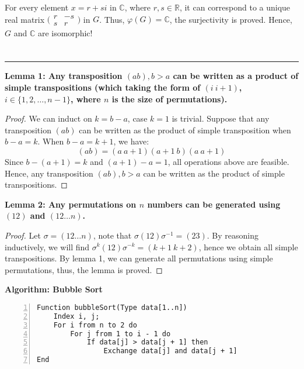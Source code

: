 \documentclass[12pt]{article}
\begin{document}
For every element $x=r+si$ in $\mathbb{C}$, where $r,s\in\mathbb{R}$, it can correspond to a unique real matrix $\big(\begin{smallmatrix} r& -s\\s & r\end{smallmatrix}\big)$ in $G$. Thus, $\varphi(G)=\mathbb{C}$, the surjectivity is proved. Hence, $G$ and $\mathbb{C}$ are isomorphic!

\newpage
\section{} %
\subsection{}
\noindent\rule{\textwidth}{1pt}
\textbf{Lemma 1: Any transposition $(ab),b>a$ can be written as a product of simple transpositions (which taking the form of $(i\ i+1)$, $i\in \{1,2,\dots,n-1\}$, where $n$ is the size of permutations).}

\begin{proof}
We can induct on $k=b-a$, case $k=1$ is trivial. Suppose that any transposition $(ab)$ can be written as the product of simple transposition when $b-a=k$. When $b-a=k+1$, we have:
$$(ab)=(a\ a+1)(a+1\ b)(a\ a+1)$$
Since $b-(a+1)=k$ and $(a+1)-a=1$, all operations above are feasible. Hence, any transposition $(ab),b>a$ can be written as the product of simple transpositions.
\end{proof}

\noindent\textbf{Lemma 2: Any permutations on $n$ numbers can be generated using $(12)$ and $(12\dots n)$.}

\begin{proof}
Let $\sigma=(12\dots n)$, note that $\sigma(12)\sigma^{-1}=(23)$. By reasoning inductively, we will find $\sigma^k (12)\sigma^{-k}=(k+1\ k+2)$, hence we obtain all simple transpositions. By lemma 1, we can generate all permutations using simple permutations, thus, the lemma is proved. 
\end{proof}



\noindent\textbf{Algorithm: Bubble Sort}
\begin{Verbatim}[numbers=left]
Function bubbleSort(Type data[1..n])
    Index i, j;
    For i from n to 2 do
        For j from 1 to i - 1 do
            If data[j] > data[j + 1] then
                Exchange data[j] and data[j + 1]
End
\end{Verbatim}
\end{document}

